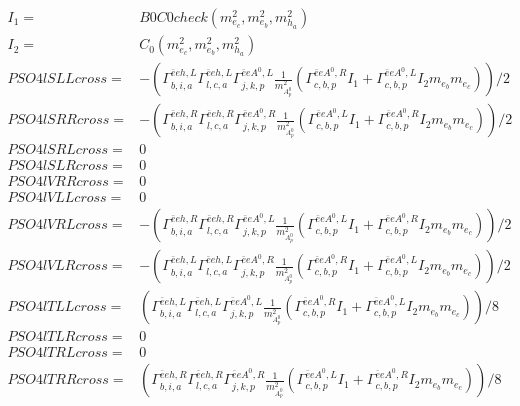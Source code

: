 \documentclass[A4,landscape]{article}
\begin{document}
\begin{align} 
I_1= & B0C0check(m^2_{e_{{c}}}, m^2_{e_{{b}}}, m^2_{h_{{a}}}) \\ 
I_2= & C_0(m^2_{e_{{c}}}, m^2_{e_{{b}}}, m^2_{h_{{a}}}) \\ 
  PSO4lSLLcross= & -( \Gamma^{\bar{e}e h ,L}_{b, i, a} \Gamma^{\bar{e}e h ,L}_{l, c, a} \Gamma^{\bar{e}e A^0 ,L}_{j, k, p} \frac{1}{m^2_{A^0_{{p}}}} (\Gamma^{\bar{e}e A^0 ,R}_{c, b, p} I_1 + \Gamma^{\bar{e}e A^0 ,L}_{c, b, p} I_2 m_{e_{{b}}} m_{e_{{c}}}))/2 \\ 
  PSO4lSRRcross= & -( \Gamma^{\bar{e}e h ,R}_{b, i, a} \Gamma^{\bar{e}e h ,R}_{l, c, a} \Gamma^{\bar{e}e A^0 ,R}_{j, k, p} \frac{1}{m^2_{A^0_{{p}}}} (\Gamma^{\bar{e}e A^0 ,L}_{c, b, p} I_1 + \Gamma^{\bar{e}e A^0 ,R}_{c, b, p} I_2 m_{e_{{b}}} m_{e_{{c}}}))/2 \\ 
  PSO4lSRLcross= & 0 \\ 
  PSO4lSLRcross= & 0 \\ 
  PSO4lVRRcross= & 0 \\ 
  PSO4lVLLcross= & 0 \\ 
  PSO4lVRLcross= & -( \Gamma^{\bar{e}e h ,R}_{b, i, a} \Gamma^{\bar{e}e h ,R}_{l, c, a} \Gamma^{\bar{e}e A^0 ,L}_{j, k, p} \frac{1}{m^2_{A^0_{{p}}}} (\Gamma^{\bar{e}e A^0 ,L}_{c, b, p} I_1 + \Gamma^{\bar{e}e A^0 ,R}_{c, b, p} I_2 m_{e_{{b}}} m_{e_{{c}}}))/2 \\ 
  PSO4lVLRcross= & -( \Gamma^{\bar{e}e h ,L}_{b, i, a} \Gamma^{\bar{e}e h ,L}_{l, c, a} \Gamma^{\bar{e}e A^0 ,R}_{j, k, p} \frac{1}{m^2_{A^0_{{p}}}} (\Gamma^{\bar{e}e A^0 ,R}_{c, b, p} I_1 + \Gamma^{\bar{e}e A^0 ,L}_{c, b, p} I_2 m_{e_{{b}}} m_{e_{{c}}}))/2 \\ 
  PSO4lTLLcross= & ( \Gamma^{\bar{e}e h ,L}_{b, i, a} \Gamma^{\bar{e}e h ,L}_{l, c, a} \Gamma^{\bar{e}e A^0 ,L}_{j, k, p} \frac{1}{m^2_{A^0_{{p}}}} (\Gamma^{\bar{e}e A^0 ,R}_{c, b, p} I_1 + \Gamma^{\bar{e}e A^0 ,L}_{c, b, p} I_2 m_{e_{{b}}} m_{e_{{c}}}))/8 \\ 
  PSO4lTLRcross= & 0 \\ 
  PSO4lTRLcross= & 0 \\ 
  PSO4lTRRcross= & ( \Gamma^{\bar{e}e h ,R}_{b, i, a} \Gamma^{\bar{e}e h ,R}_{l, c, a} \Gamma^{\bar{e}e A^0 ,R}_{j, k, p} \frac{1}{m^2_{A^0_{{p}}}} (\Gamma^{\bar{e}e A^0 ,L}_{c, b, p} I_1 + \Gamma^{\bar{e}e A^0 ,R}_{c, b, p} I_2 m_{e_{{b}}} m_{e_{{c}}}))/8 \\ 
\end{align} 
\end{document}
